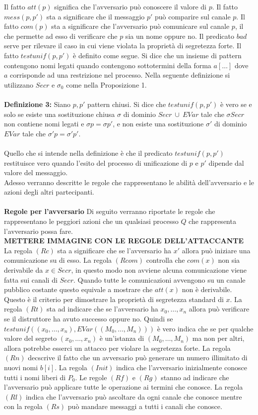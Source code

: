 \documentclass[12pt]{report}
\begin{document}
Il fatto $att(p)$ significa che l'avversario può conoscere il valore di $p$. Il fatto $mess(p,p')$ sta a significare che il messaggio $p'$ può comparire sul canale $p$. Il fatto $com(p)$ sta a significare che l'avversario può comunicare sul canale $p$, il che permette ad esso di verificare che $p$ sia un nome oppure no. Il predicato $bad$ serve per rilevare il caso in cui viene violata la proprietà di segretezza forte. Il fatto $testunif(p,p')$ è definito come segue. Si dice che un insieme di pattern contengono nomi legati quando contengono sottotermini della forma $a[\dots]$ dove $a$ corrisponde ad una restrizione nel processo. Nella seguente definizione si utilizzano $Secr$ e $\sigma_0$ come nella Proposizione 1.\\
\\
\textbf{Definizione 3:} Siano $p,p'$ pattern chiusi. Si dice che $testunif(p,p')$ è vero se e solo se esiste una sostituzione chiusa $\sigma$ di dominio $Secr\ \cup \ EVar $ tale che $\sigma Secr$ non contiene nomi legati e $\sigma p = \sigma p'$, e non esiste una sostituzione $\sigma'$ di dominio $EVar$ tale che $\sigma' p = \sigma' p'$.\\
\\
Quello che si intende nella definizione è che il predicato $testunif(p,p')$ restituisce vero quando l'esito del processo di unificazione di $p$ e $p'$ dipende dal valore del messaggio.\\
Adesso verranno descritte le regole che rappresentano le abilità dell'avversario e le azioni degli altri partecipanti.\\
\\
\textbf{Regole per l'avversario } Di seguito verranno riportate le regole che rappresentano le peggiori azioni che un qualsiasi processo $Q$ che rappresenta l'avversario possa fare.\\
\textbf{METTERE IMMAGINE CON LE REGOLE DELL'ATTACCANTE}\\
La regola $(Rc)$ sta a significare che se l'avversario ha $x'$ allora può iniziare una comunicazione su di esso. La regola $(Rcom)$ controlla che $com(x)$ non sia derivabile da $x \in Secr$, in questo modo non avviene alcuna comunicazione viene fatta sui canali di  $Secr$. Quando tutte le comunicazioni avvengono su un canale pubblico costante questo equivale a mostrare che $att(x)$ non è derivabile. Questo è il criterio per dimostrare la proprietà di segretezza standard di $x$. La regola $(Rt)$ sta ad indicare che se l'avversario ha $x_0,\dots,x_n$ allora può verificare se il distruttore ha avuto successo oppure no. Quindi se $testunif((x_0,\dots,x_n),EVar((M_0,\dots,M_n)))$ è vero indica che se per qualche valore del segreto $(x_0,\dots,x_n)$ è un'istanza di $(M_0,\dots,M_n)$ ma non per altri, allora potrebbe esserci un attacco per violare la segretezza forte. La regola $(Rn)$ decscrive il fatto che un avversario può generare un numero illimitato di nuovi nomi $b[i]$. La regola $(Init)$ indica che l'avversario inizialmente conosce tutti i nomi liberi di $P_0$. Le regole $(Rf)$ e $(Rg)$ stanno ad indicare che l'avversario può applicare tutte le operazione ai termini che conosce. La regola $(Rl)$ indica che l'avversario può ascoltare da ogni canale che conosce mentre con la regola $(Rs)$ può mandare messaggi a tutti i canali che conosce.\\
\end{document}
